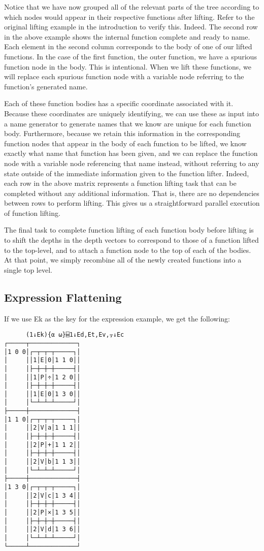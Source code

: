 \documentclass[pldi]{sigplanconf-pldi15}
\begin{document}
Notice that we have now grouped all of the relevant parts of the tree according to which nodes would 
appear in their respective functions after lifting. Refer to the original lifting example in the 
introduction to verify this. Indeed. The second row in the above example shows the internal function 
complete and ready to name. Each element in the second column corresponds to the body of one of our 
lifted functions. In the case of the first function, the outer function, we have a spurious function node 
in the body. This is intentional. When we lift these functions, we will replace each spurious function 
node with a variable node referring to the function’s generated name. 

Each of these function bodies has a specific coordinate associated with it. Because these coordinates 
are uniquely identifying, we can use these as input into a name generator to generate names that we 
know are unique for each function body. Furthermore, because we retain this information in the 
corresponding function nodes that appear in the body of each function to be lifted, we know exactly what 
name that function has been given, and we can replace the function node with a variable node referencing 
that name instead, without referring to any state outside of the immediate information given to the 
function lifter. Indeed, each row in the above matrix represents a function lifting task that can be 
completed without any additional information. That is, there are no dependencies between rows to perform 
lifting. This gives us a straightforward parallel execution of function lifting. 

The final task to complete function lifting of each function body before lifting is to shift the depths in 
the depth vectors to correspond to those of a function lifted to the top-level, and to attach a function 
node to the top of each of the bodies. At that point, we simply recombine all of the newly created functions 
into a single top level. 
\subsection{Expression Flattening}

If we use Ek as the key for the expression example, we get the following:

\begin{verbatim}
      (1↓Ek){⍺ ⍵}⌸1↓Ed,Et,Ev,⍪↓Ec
┌─────┬─────────────┐
│1 0 0│┌─┬─┬─┬─────┐│
│     ││1│E│0│1 1 0││
│     │├─┼─┼─┼─────┤│
│     ││1│P│÷│1 2 0││
│     │├─┼─┼─┼─────┤│
│     ││1│E│0│1 3 0││
│     │└─┴─┴─┴─────┘│
├─────┼─────────────┤
│1 1 0│┌─┬─┬─┬─────┐│
│     ││2│V│a│1 1 1││
│     │├─┼─┼─┼─────┤│
│     ││2│P│+│1 1 2││
│     │├─┼─┼─┼─────┤│
│     ││2│V│b│1 1 3││
│     │└─┴─┴─┴─────┘│
├─────┼─────────────┤
│1 3 0│┌─┬─┬─┬─────┐│
│     ││2│V│c│1 3 4││
│     │├─┼─┼─┼─────┤│
│     ││2│P│×│1 3 5││
│     │├─┼─┼─┼─────┤│
│     ││2│V│d│1 3 6││
│     │└─┴─┴─┴─────┘│
└─────┴─────────────┘
\end{verbatim}
\end{document}
